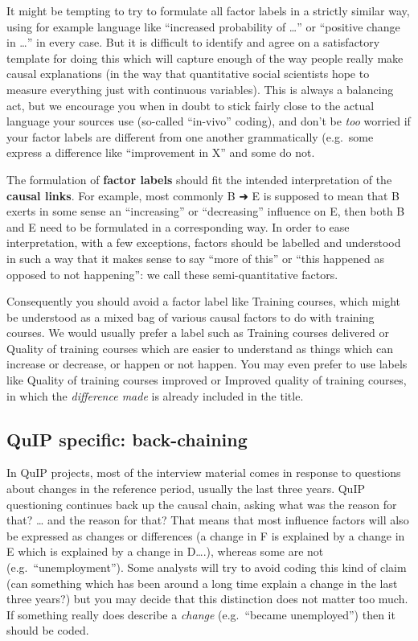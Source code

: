 \documentclass[
]{book}
\begin{document}
It might be tempting to try to formulate all factor labels in a strictly similar way, using for example language like ``increased probability of \ldots{}'' or ``positive change in \ldots{}'' in every case. But it is difficult to identify and agree on a satisfactory template for doing this which will capture enough of the way people really make causal explanations (in the way that quantitative social scientists hope to measure everything just with continuous variables). This is always a balancing act, but we encourage you when in doubt to stick fairly close to the actual language your sources use (so-called ``in-vivo'' coding), and don't be \emph{too} worried if your factor labels are different from one another grammatically (e.g.~some express a difference like ``improvement in X'' and some do not.

The formulation of \textbf{factor labels} should fit the intended interpretation of the \textbf{causal links}. For example, most commonly B ➜ E is supposed to mean that B exerts in some sense an ``increasing'' or ``decreasing'' influence on E, then both B and E need to be formulated in a corresponding way. In order to ease interpretation, with a few exceptions, factors should be labelled and understood in such a way that it makes sense to say ``more of this'' or ``this happened as opposed to not happening'': we call these semi-quantitative factors.

Consequently you should avoid a factor label like Training courses, which might be understood as a mixed bag of various causal factors to do with training courses. We would usually prefer a label such as Training courses delivered or Quality of training courses which are easier to understand as things which can increase or decrease, or happen or not happen. You may even prefer to use labels like Quality of training courses improved or Improved quality of training courses, in which the \emph{difference made} is already included in the title.

\hypertarget{quip-specific-back-chaining}{%
\subsection{QuIP specific: back-chaining}\label{quip-specific-back-chaining}}

In QuIP projects, most of the interview material comes in response to questions about changes in the reference period, usually the last three years. QuIP questioning continues back up the causal chain, asking what was the reason for that? \ldots{} and the reason for that? That means that most influence factors will also be expressed as changes or differences (a change in F is explained by a change in E which is explained by a change in D\ldots.), whereas some are not (e.g.~``unemployment''). Some analysts will try to avoid coding this kind of claim (can something which has been around a long time explain a change in the last three years?) but you may decide that this distinction does not matter too much. If something really does describe a \emph{change} (e.g.~``became unemployed'') then it should be coded.
\end{document}
